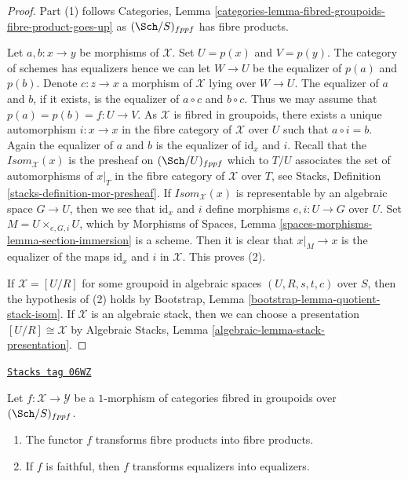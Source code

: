 \begin{proof}
Part (1) follows
Categories, Lemma \ref{categories-lemma-fibred-groupoids-fibre-product-goes-up}
as $(\Sch/S)_{fppf}$ has fibre products.

\medskip\noindent
Let $a, b : x \to y$ be morphisms of $\mathcal{X}$.
Set $U = p(x)$ and $V = p(y)$. The category of schemes has equalizers
hence we can let $W \to U$ be the equalizer of $p(a)$ and $p(b)$.
Denote $c : z \to x$ a morphism of $\mathcal{X}$ lying over $W \to U$.
The equalizer of $a$ and $b$, if it exists, is the equalizer of $a \circ c$
and $b \circ c$. Thus we may assume that $p(a) = p(b) = f : U \to V$.
As $\mathcal{X}$ is fibred in groupoids, there exists a unique automorphism
$i : x \to x$ in the fibre category of $\mathcal{X}$ over $U$ such that
$a \circ i = b$. Again the equalizer of $a$ and $b$ is the equalizer
of $\text{id}_x$ and $i$. Recall that the $\mathit{Isom}_\mathcal{X}(x)$
is the presheaf on $(\Sch/U)_{fppf}$ which to
$T/U$ associates the set of automorphisms of $x|_T$ in the fibre category
of $\mathcal{X}$ over $T$, see
Stacks, Definition \ref{stacks-definition-mor-presheaf}.
If $\mathit{Isom}_\mathcal{X}(x)$ is representable by an algebraic space
$G \to U$, then we see that $\text{id}_x$ and $i$ define morphisms
$e, i : U \to G$ over $U$. Set $M = U \times_{e, G, i} U$, which by
Morphisms of Spaces, Lemma \ref{spaces-morphisms-lemma-section-immersion}
is a scheme. Then it is clear that $x|_M \to x$ is the equalizer of
the maps $\text{id}_x$ and $i$ in $\mathcal{X}$.
This proves (2).

\medskip\noindent
If $\mathcal{X} = [U/R]$ for some groupoid in algebraic spaces
$(U, R, s, t, c)$ over $S$, then the hypothesis of (2) holds by
Bootstrap, Lemma \ref{bootstrap-lemma-quotient-stack-isom}.
If $\mathcal{X}$ is an algebraic stack, then we can choose a
presentation $[U/R] \cong \mathcal{X}$ by
Algebraic Stacks, Lemma \ref{algebraic-lemma-stack-presentation}.
\end{proof}

\begin{lemma}
\label{stacks-sheaves-lemma-fibre-products-morphism}
\href{https://stacks.math.columbia.edu/tag/06WZ}{\texttt{Stacks tag 06WZ}}

Let $f : \mathcal{X} \to \mathcal{Y}$ be a $1$-morphism of categories
fibred in groupoids over $(\Sch/S)_{fppf}$.
\begin{enumerate}
\item The functor $f$ transforms fibre products into fibre products.
\item If $f$ is faithful, then $f$ transforms equalizers into equalizers.
\end{enumerate}
\end{lemma}

